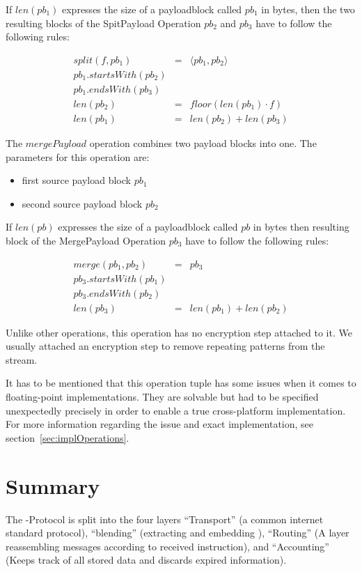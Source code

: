 If $len(pb_1)$ expresses the size of a payloadblock called $pb_1$ in bytes, then the two resulting blocks of the SpitPayload Operation $pb_2$ and $pb_3$ have to follow the following rules:

\begin{eqnarray}
split(f, pb_1) & = &\langle pb_1, pb_2 \rangle\\
pb_1.startsWith(pb_2)\\
pb_1.endsWith(pb_3)\\
len(pb_2) & = & floor(len(pb_1)\cdot f)\\
len(pb_1) & = & len(pb_2) + len(pb_3)
\end{eqnarray}

The $mergePayload$ operation combines two payload blocks into one. The parameters for this operation are:

\begin{itemize}
	\item first source payload block $pb_1$
	\item second source payload block $pb_2$
\end{itemize}

If $len(pb)$ expresses the size of a payloadblock called $pb$ in bytes then resulting block of the MergePayload Operation $pb_3$ have to follow the following rules:

\begin{eqnarray}
merge(pb_1, pb_2) & = & pb_3 \\
pb_3.startsWith(pb_1)\\
pb_3.endsWith(pb_2)\\
len(pb_3) & = & len(pb_1) + len(pb_2)
\end{eqnarray}

Unlike other operations, this operation has no encryption step attached to it. We usually attached an encryption step to remove repeating patterns from the \VortexMessage stream.

It has to be mentioned that this operation tuple has some issues when it comes to floating-point implementations. They are solvable but had to be specified unexpectedly precisely in order to enable a true cross-platform implementation. For more information regarding the issue and exact implementation, see section~\ref{sec:implOperations}.


\section{Summary}
The \MessageVortex{}-Protocol is split into the four layers ``Transport'' (a common internet standard protocol), ``blending'' (extracting and embedding \VortexMessages), ``Routing'' (A layer reassembling messages according to received instruction), and ``Accounting'' (Keeps track of all stored data and discards expired information).

